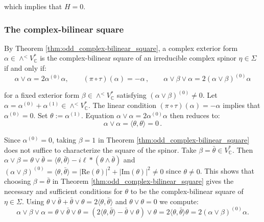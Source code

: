 \documentclass[10pt,a4paper,twoside,reqno]{amsart}
\theoremstyle{plain}
\theoremstyle{definition}
\theoremstyle{remark}
\def\C{\mathbb{C}}
\def\Re{\mathrm{Re}}
\def\Im{\mathrm{Im}}
\newcommand{\abs}[1]{\left\lvert#1\right\rvert}
\newcommand{\escal}[1]{\langle#1\rangle}
\begin{document}
\noindent
which implies that $H=0$.


\subsubsection{The complex-bilinear square}


By Theorem \ref{thm:odd_complex-bilinear_square}, a complex exterior form $\alpha\in\wedge^< V^*_\C$ is the complex-bilinear square of an irreducible complex spinor $\eta \in \Sigma$ if and only if:
\begin{equation*}
\alpha\vee\alpha=2\alpha^{(0)}\alpha,\qquad(\pi\circ\tau)(\alpha) =-\alpha \, , \qquad \alpha\vee\beta\vee\alpha=2(\alpha\vee\beta)^{(0)}\alpha    
\end{equation*}

\noindent
for a fixed exterior form $\beta\in\wedge^<V^*_\C$ satisfying $(\alpha\vee\beta)^{(0)} \neq 0$. Let $\alpha = \alpha^{(0)} + \alpha^{(1)} \in \wedge^<V^*_\C$. The linear condition $(\pi\circ\tau)(\alpha)=-\alpha$ implies that $\alpha^{(0)}=0$. Set $\theta:=\alpha^{(1)}$. Equation $\alpha\vee\alpha=2\alpha^{(0)}\alpha$ then reduces to:
\begin{equation*}
\alpha\vee\alpha=\escal{\theta,\theta}=0\, .
\end{equation*}

\noindent
Since $\alpha^{(0)}=0$, taking $\beta=1$ in Theorem \ref{thm:odd_complex-bilinear_square} does not suffice to characterize the square of the spinor. Take $\beta=\bar\theta\in V^*_\C$. Then $\alpha\vee\beta=\theta\vee\bar\theta=\escal{\theta,\bar\theta}-i\ell*(\theta\wedge\bar\theta)$ and $(\alpha\vee\beta)^{(0)} = \escal{\theta,\bar\theta} = \abs{\Re(\theta)}^2 + \abs{\Im(\theta)}^2 \neq 0$ since $\theta\neq0$. This shows that choosing $\beta=\bar\theta $ in Theorem \ref{thm:odd_complex-bilinear_square} gives the necessary and sufficient conditions for $\theta$ to be the complex-bilinear square of $\eta\in\Sigma$. Using $\theta\vee\bar\theta+\bar\theta\vee\theta=2\escal{\theta,\bar\theta}$ and $\theta\vee\theta=0$ we compute: 
\begin{equation*}
\alpha\vee\beta\vee\alpha = \theta\vee\bar\theta\vee\theta=(2\escal{\theta,\bar\theta}-\bar\theta \vee \theta) \vee \theta = 2 \escal{\theta,\bar\theta} \theta= 2(\alpha\vee\beta)^{(0)}\alpha.
\end{equation*}
\end{document}
